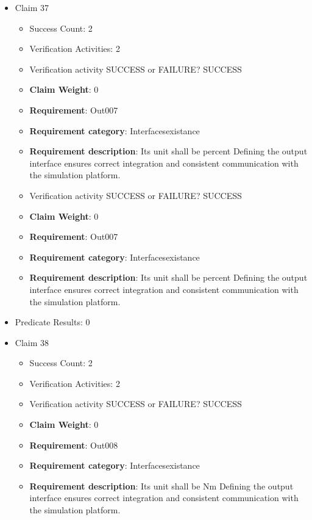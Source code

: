 \documentclass{article}
\begin{document}
\begin{itemize}
  				  \item Claim 37
				\begin{itemize}
			    	\item Success Count: 2 
			    	\item Verification Activities: 2
					\item Verification activity SUCCESS or FAILURE? SUCCESS
					\item \textbf{Claim Weight}: 0
						\item \textbf{Requirement}: Out007 
						\item \textbf{Requirement category}: Interfacesexistance 
						\item \textbf{Requirement description}: Its unit shall be percent Defining the output interface ensures correct integration and consistent communication with the simulation platform.
					
					\item Verification activity SUCCESS or FAILURE? SUCCESS
					\item \textbf{Claim Weight}: 0
						\item \textbf{Requirement}: Out007 
						\item \textbf{Requirement category}: Interfacesexistance 
						\item \textbf{Requirement description}: Its unit shall be percent Defining the output interface ensures correct integration and consistent communication with the simulation platform.
					
				\end{itemize}
				
									    
				\item Predicate Results: 0

  				  \item Claim 38
				\begin{itemize}
			    	\item Success Count: 2 
			    	\item Verification Activities: 2
					\item Verification activity SUCCESS or FAILURE? SUCCESS
					\item \textbf{Claim Weight}: 0
						\item \textbf{Requirement}: Out008 
						\item \textbf{Requirement category}: Interfacesexistance 
						\item \textbf{Requirement description}: Its unit shall be Nm Defining the output interface ensures correct integration and consistent communication with the simulation platform.
					

\end{itemize}
\end{itemize}
\end{document}
